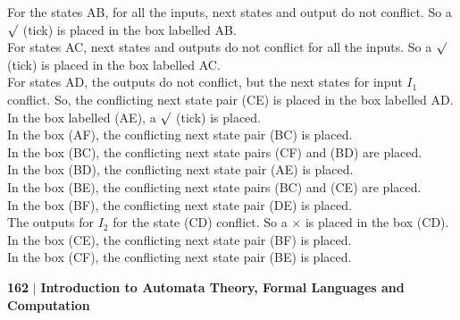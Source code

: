 \documentclass[10pt]{article}
\begin{document}
\vspace{0.2cm}
\hspace*{0.5cm} For the states AB, for all the inputs, next states and output do not conflict. So a $\surd$ (tick) is placed in
the box labelled AB.\\
\hspace*{0.5cm} For states AC, next states and outputs do not conflict for all the inputs. So a $\surd$ (tick) is placed in the
box labelled AC.\\


\hspace*{0.5cm} For states AD, the outputs do not conflict, but the next states for input $I_1$ conflict. So, the conflicting
next state pair (CE) is placed in the box labelled AD.\\
\hspace*{0.5cm} In the box labelled (AE), a $\surd$ (tick) is placed.\\
\hspace*{0.5cm} In the box (AF), the conflicting next state pair (BC) is placed.\\
\hspace*{0.5cm} In the box (BC), the conflicting next state pairs (CF) and (BD) are placed.\\
\hspace*{0.5cm} In the box (BD), the conflicting next state pair (AE) is placed.\\
\hspace*{0.5cm} In the box (BE), the conflicting next state pairs (BC) and (CE) are placed.\\
\hspace*{0.5cm} In the box (BF), the conflicting next state pair (DE) is placed.\\
\hspace*{0.5cm} The outputs for $I_2$ for the state (CD) conflict. So a $\times$ is placed in the box (CD).\\
\hspace*{0.5cm} In the box (CE), the conflicting next state pair (BF) is placed.\\
\hspace*{0.5cm} In the box (CF), the conflicting next state pair (BE) is placed.\\

\newpage
 \begin{flushleft}
    \textbf{162}\hspace*{0.1cm} \textbf{$|$} \hspace*{0.1cm} {\tiny \textbf{Introduction to Automata Theory, Formal Languages and Computation}}
  \end{flushleft}
\vspace*{0.4cm}
\end{document}
